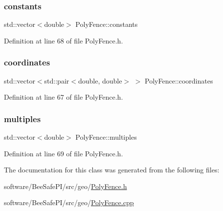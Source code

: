 \subsubsection{\texorpdfstring{constants}{constants}}
{\footnotesize\ttfamily std\+::vector$<$double$>$ Poly\+Fence\+::constants\hspace{0.3cm}{\ttfamily [private]}}



Definition at line 68 of file Poly\+Fence.\+h.

\mbox{\label{class_poly_fence_ae8e0c55e745979cab104ef80aeb4b418}} 
\subsubsection{\texorpdfstring{coordinates}{coordinates}}
{\footnotesize\ttfamily std\+::vector$<$std\+::pair$<$double, double$>$ $>$ Poly\+Fence\+::coordinates\hspace{0.3cm}{\ttfamily [private]}}



Definition at line 67 of file Poly\+Fence.\+h.

\mbox{\label{class_poly_fence_a2204e62b61b0e3c335734fa0b6cf0728}} 
\subsubsection{\texorpdfstring{multiples}{multiples}}
{\footnotesize\ttfamily std\+::vector$<$double$>$ Poly\+Fence\+::multiples\hspace{0.3cm}{\ttfamily [private]}}



Definition at line 69 of file Poly\+Fence.\+h.



The documentation for this class was generated from the following files\+:\begin{DoxyCompactItemize}
\item 
software/\+Bee\+Safe\+P\+I/src/geo/\hyperlink{_poly_fence_8h}{Poly\+Fence.\+h}\item 
software/\+Bee\+Safe\+P\+I/src/geo/\hyperlink{_poly_fence_8cpp}{Poly\+Fence.\+cpp}\end{DoxyCompactItemize}
